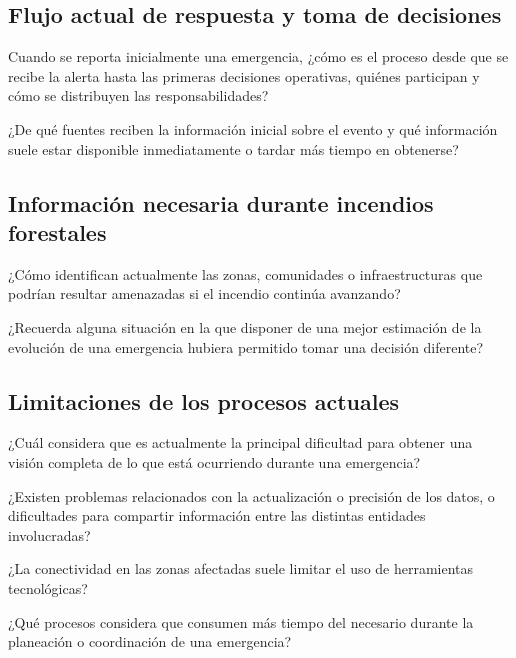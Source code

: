 
\subsection{Flujo actual de respuesta y toma de decisiones}

\begin{enumerate}
  \pregunta Cuando se reporta inicialmente una emergencia, ¿cómo es el proceso desde que se recibe la alerta hasta las primeras decisiones operativas, quiénes participan y cómo se distribuyen las responsabilidades?


  \pregunta ¿De qué fuentes reciben la información inicial sobre el evento y qué información suele estar disponible inmediatamente o tardar más tiempo en obtenerse?




\end{enumerate}


\subsection{Información necesaria durante incendios forestales}

\begin{enumerate}


  \pregunta ¿Cómo identifican actualmente las zonas, comunidades o infraestructuras que podrían resultar amenazadas si el incendio continúa avanzando?



  \pregunta ¿Recuerda alguna situación en la que disponer de una mejor estimación de la evolución de una emergencia hubiera permitido tomar una decisión diferente?
\end{enumerate}


\subsection{Limitaciones de los procesos actuales}

\begin{enumerate}
  \pregunta ¿Cuál considera que es actualmente la principal dificultad para obtener una visión completa de lo que está ocurriendo durante una emergencia?

  \pregunta ¿Existen problemas relacionados con la actualización o precisión de los datos, o dificultades para compartir información entre las distintas entidades involucradas?


  \pregunta ¿La conectividad en las zonas afectadas suele limitar el uso de herramientas tecnológicas?


  \pregunta ¿Qué procesos considera que consumen más tiempo del necesario durante la planeación o coordinación de una emergencia?
\end{enumerate}


